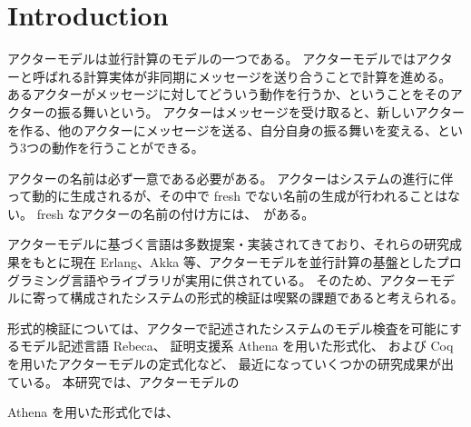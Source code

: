 \section{Introduction}
アクターモデルは並行計算のモデルの一つである。
アクターモデルではアクターと呼ばれる計算実体が非同期にメッセージを送り合うことで計算を進める。
あるアクターがメッセージに対してどういう動作を行うか、ということをそのアクターの振る舞いという。
アクターはメッセージを受け取ると、新しいアクターを作る、他のアクターにメッセージを送る、自分自身の振る舞いを変える、という3つの動作を行うことができる。

アクターの名前は必ず一意である必要がある。
アクターはシステムの進行に伴って動的に生成されるが、その中で fresh でない名前の生成が行われることはない。
fresh なアクターの名前の付け方には、~がある。

アクターモデルに基づく言語は多数提案・実装されてきており、それらの研究成果をもとに現在 Erlang、Akka 等、アクターモデルを並行計算の基盤としたプログラミング言語やライブラリが実用に供されている。
そのため、アクターモデルに寄って構成されたシステムの形式的検証は喫緊の課題であると考えられる。

形式的検証については、アクターで記述されたシステムのモデル検査を可能にするモデル記述言語 Rebeca、
証明支援系 Athena を用いた形式化、
および Coq を用いたアクターモデルの定式化など、
最近になっていくつかの研究成果が出ている。
本研究では、アクターモデルの

Athena を用いた形式化では、
